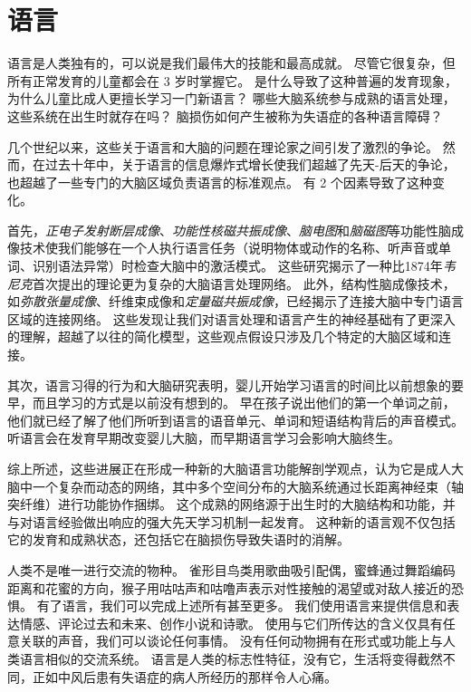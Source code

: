 \chapter{语言} \label{chap:chap55}

语言是人类独有的，可以说是我们最伟大的技能和最高成就。
尽管它很复杂，但所有正常发育的儿童都会在 3 岁时掌握它。
是什么导致了这种普遍的发育现象，为什么儿童比成人更擅长学习一门新语言？
哪些大脑系统参与成熟的语言处理，这些系统在出生时就存在吗？
脑损伤如何产生被称为失语症的各种语言障碍？


几个世纪以来，这些关于语言和大脑的问题在理论家之间引发了激烈的争论。
然而，在过去十年中，关于语言的信息爆炸式增长使我们超越了先天-后天的争论，也超越了一些专门的大脑区域负责语言的标准观点。
有 2 个因素导致了这种变化。


首先，\textit{正电子发射断层成像}、\textit{功能性核磁共振成像}、\textit{脑电图}和\textit{脑磁图}等功能性脑成像技术使我们能够在一个人执行语言任务（说明物体或动作的名称、听声音或单词、识别语法异常）时检查大脑中的激活模式。
这些研究揭示了一种比1874年\textit{韦尼克}首次提出的理论更为复杂的大脑语言处理网络。
此外，结构性脑成像技术，如\textit{弥散张量成像}、纤维束成像和\textit{定量磁共振成像}，已经揭示了连接大脑中专门语言区域的连接网络。
这些发现让我们对语言处理和语言产生的神经基础有了更深入的理解，超越了以往的简化模型，这些观点假设只涉及几个特定的大脑区域和连接。


其次，语言习得的行为和大脑研究表明，婴儿开始学习语言的时间比以前想象的要早，而且学习的方式是以前没有想到的。
早在孩子说出他们的第一个单词之前，他们就已经了解了他们所听到语言的语音单元、单词和短语结构背后的声音模式。
听语言会在发育早期改变婴儿大脑，而早期语言学习会影响大脑终生。


综上所述，这些进展正在形成一种新的大脑语言功能解剖学观点，认为它是成人大脑中一个复杂而动态的网络，其中多个空间分布的大脑系统通过长距离神经束（轴突纤维）进行功能协作捆绑。
这个成熟的网络源于出生时的大脑结构和功能，并与对语言经验做出响应的强大先天学习机制一起发育。
这种新的语言观不仅包括它的发育和成熟状态，还包括它在脑损伤导致失语时的消解。


人类不是唯一进行交流的物种。
雀形目鸟类用歌曲吸引配偶，蜜蜂通过舞蹈编码距离和花蜜的方向，猴子用咕咕声和咕噜声表示对性接触的渴望或对敌人接近的恐惧。
有了语言，我们可以完成上述所有甚至更多。
我们使用语言来提供信息和表达情感、评论过去和未来、创作小说和诗歌。
使用与它们所传达的含义仅具有任意关联的声音，我们可以谈论任何事情。
没有任何动物拥有在形式或功能上与人类语言相似的交流系统。
语言是人类的标志性特征，没有它，生活将变得截然不同，正如中风后患有失语症的病人所经历的那样令人心痛。



